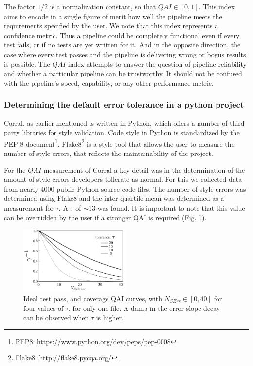 \documentclass[final,5p,times,twocolumn,authoryear]{elsarticle}
\begin{document}
The factor $1/2$ is a normalization constant, so that $QAI \in [0, 1]$.
%
This index aims to encode in a single figure of merit how well the pipeline
meets the requirements specified by the user.
%
We note that this index represents a confidence metric. 
Thus a pipeline could be completely functional even if every test fails, 
or if no tests are yet written for it. 
%
\textcolor{blue!95}{
And in the opposite direction, the case where every test passes and the pipeline
is delivering wrong or bogus results is possible.}
%
The $QAI$ index attempts to answer the question of pipeline
reliability and whether a particular pipeline can be trustworthy.
%
It should not be confused with the pipeline's speed,
capability, or any other performance metric.
%
\subsubsection{Determining the default error tolerance in a python project}
%
Corral, as earlier mentioned is written in Python,
which offers a number of third party libraries for
style validation. Code style in Python is standardized by the
PEP 8 document\footnote{PEP8: \url{https://www.python.org/dev/peps/pep-0008}}.
Flake8\footnote{Flake8: \url{http://flake8.pycqa.org/}} is a style tool that allows
the user to measure the number of style errors, that reflects the maintainability of the project.

For the $QAI$ measurement of Corral a key detail was in the determination of the amount of style errors developers tollerate as normal. For this we collected data from nearly $4000$ public Python source code files. The number of style errors was determined using Flake8 and the inter-quartile mean
was determined as a measurement for $\tau$. A $\tau$ of $\sim 13$ was found. It is important to note that this value can be
overridden by the user if a stronger QAI is required (Fig. \ref{fig:tau}).
%
\begin{figure}
\centering
\includegraphics[width=0.5\textwidth]{PF.pdf}
\caption{\label{fig:tau} Ideal test pass, and coverage QAI curves, with $N_{SErr} \in [0, 40]$ for
    four values of $\tau$, for only one file.
    A damp in the error slope decay can be observed when $\tau$
    is higher.
}
\end{figure}
%
\end{document}
